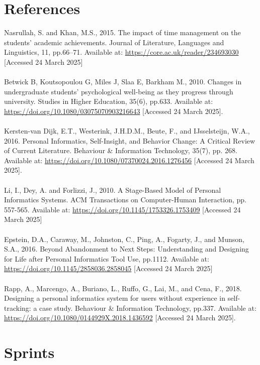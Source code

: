 \documentclass[12pt,a4paper]{article}
\begin{document}
\section*{References}
Nasrullah, S. and Khan, M.S., 2015. The impact of time management on the students’ academic achievements. Journal of Literature, Languages and Linguistics, 11, pp.66–71. Available at: \url{https://core.ac.uk/reader/234693030} [Accessed 24 March 2025]
\\
\\
Betwick B, Koutsopoulou G, Miles J, Slaa E, Barkham M., 2010. Changes in undergraduate students' psychological well-being as they progress through university. Studies in Higher Education, 35(6), pp.633. Available at: \url{https://doi.org/10.1080/03075070903216643} [Accessed 24 March 2025].
\\
\\
Kersten-van Dijk, E.T., Westerink, J.H.D.M., Beute, F., and IJsselsteijn, W.A., 2016. Personal Informatics, Self-Insight, and Behavior Change: A Critical Review of Current Literature. Behaviour \& Information Technology, 35(7), pp. 268. Available at: \url{https://doi.org/10.1080/07370024.2016.1276456}  
[Accessed 24 March 2025].
\\
\\
Li, I., Dey, A. and Forlizzi, J., 2010. A Stage-Based Model of Personal Informatics Systems. ACM Transactions on Computer-Human Interaction, pp. 557-565. Available at: \url{https://doi.org/10.1145/1753326.1753409} [Accessed 24 March 2025]
\\
\\
Epstein, D.A., Caraway, M., Johnston, C., Ping, A., Fogarty, J., and Munson, S.A., 2016. Beyond Abandonment to Next Steps: Understanding and Designing for Life after Personal Informatics Tool Use, pp.1112. Available at: \url{https://doi.org/10.1145/2858036.2858045} 
[Accessed 24 March 2025]
\\
\\
Rapp, A., Marcengo, A., Buriano, L., Ruffo, G., Lai, M., and Cena, F., 2018. Designing a personal informatics system for users without experience in self-tracking: a case study. Behaviour \& Information Technology, pp.337. Available at: \url{https://doi.org/10.1080/0144929X.2018.1436592} 
[Accessed 24 March 2025].


\newpage
\appendix

\section{Sprints}
\end{document}
